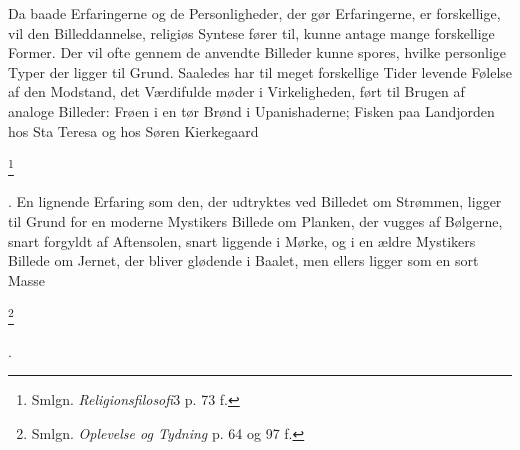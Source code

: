 \documentclass[12pt]{article}
\begin{document}
Da baade Erfaringerne og de Personligheder, der gør Erfaringerne, er
forskellige, vil den Billeddannelse, religiøs Syntese fører til, kunne antage
mange forskellige Former. Der vil ofte gennem de anvendte Billeder kunne
spores, hvilke personlige Typer der ligger til Grund. Saaledes har til meget
forskellige Tider levende Følelse af den Modstand, det Værdifulde møder i
Virkeligheden, ført til Brugen af analoge Billeder: Frøen i en tør Brønd i
Upanishaderne; Fisken paa Landjorden hos Sta Teresa og hos Søren Kierkegaard

         \footnote{Smlgn. \textit{Religionsfilosofi}3 p. 73 f.}

      . En lignende Erfaring som den, der udtryktes ved Billedet om Strømmen,
ligger til Grund for en moderne Mystikers Billede om Planken, der vugges af
Bølgerne, snart forgyldt af Aftensolen, snart liggende i Mørke, og i en ældre
Mystikers Billede om Jernet, der bliver glødende i Baalet, men ellers ligger
som en sort Masse

         \footnote{Smlgn. \textit{Oplevelse og Tydning} p. 64 og 97 f.}

      .
\end{document}

